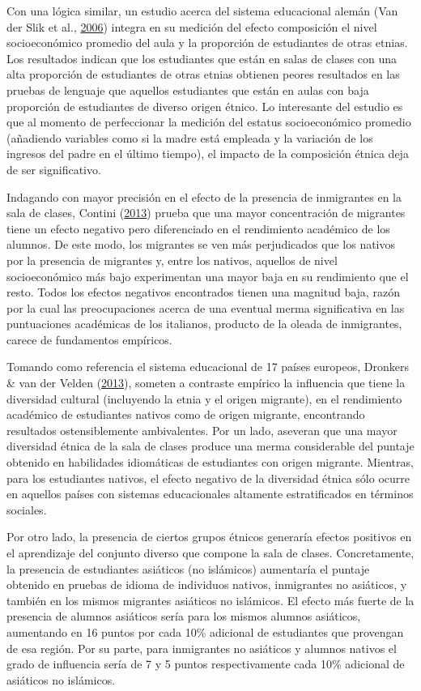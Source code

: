 \documentclass[
]{article}
\begin{document}
Con una lógica similar, un estudio acerca del sistema educacional alemán
(Van der Slik et al.,
\protect\hyperlink{ref-vanderslik_ethnic_2006}{2006}) integra en su
medición del efecto composición el nivel socioeconómico promedio del
aula y la proporción de estudiantes de otras etnias. Los resultados
indican que los estudiantes que están en salas de clases con una alta
proporción de estudiantes de otras etnias obtienen peores resultados en
las pruebas de lenguaje que aquellos estudiantes que están en aulas con
baja proporción de estudiantes de diverso origen étnico. Lo interesante
del estudio es que al momento de perfeccionar la medición del estatus
socioeconómico promedio (añadiendo variables como si la madre está
empleada y la variación de los ingresos del padre en el último tiempo),
el impacto de la composición étnica deja de ser significativo.

Indagando con mayor precisión en el efecto de la presencia de
inmigrantes en la sala de clases, Contini
(\protect\hyperlink{ref-contini_immigrant_2013}{2013}) prueba que una
mayor concentración de migrantes tiene un efecto negativo pero
diferenciado en el rendimiento académico de los alumnos. De este modo,
los migrantes se ven más perjudicados que los nativos por la presencia
de migrantes y, entre los nativos, aquellos de nivel socioeconómico más
bajo experimentan una mayor baja en su rendimiento que el resto. Todos
los efectos negativos encontrados tienen una magnitud baja, razón por la
cual las preocupaciones acerca de una eventual merma significativa en
las puntuaciones académicas de los italianos, producto de la oleada de
inmigrantes, carece de fundamentos empíricos.

Tomando como referencia el sistema educacional de 17 países europeos,
Dronkers \& van der Velden
(\protect\hyperlink{ref-dronkers_positive_2013a}{2013}), someten a
contraste empírico la influencia que tiene la diversidad cultural
(incluyendo la etnia y el origen migrante), en el rendimiento académico
de estudiantes nativos como de origen migrante, encontrando resultados
ostensiblemente ambivalentes. Por un lado, aseveran que una mayor
diversidad étnica de la sala de clases produce una merma considerable
del puntaje obtenido en habilidades idiomáticas de estudiantes con
origen migrante. Mientras, para los estudiantes nativos, el efecto
negativo de la diversidad étnica sólo ocurre en aquellos países con
sistemas educacionales altamente estratificados en términos sociales.

Por otro lado, la presencia de ciertos grupos étnicos generaría efectos
positivos en el aprendizaje del conjunto diverso que compone la sala de
clases. Concretamente, la presencia de estudiantes asiáticos (no
islámicos) aumentaría el puntaje obtenido en pruebas de idioma de
individuos nativos, inmigrantes no asiáticos, y también en los mismos
migrantes asiáticos no islámicos. El efecto más fuerte de la presencia
de alumnos asiáticos sería para los mismos alumnos asiáticos, aumentando
en 16 puntos por cada 10\% adicional de estudiantes que provengan de esa
región. Por su parte, para inmigrantes no asiáticos y alumnos nativos el
grado de influencia sería de 7 y 5 puntos respectivamente cada 10\%
adicional de asiáticos no islámicos.
\end{document}
